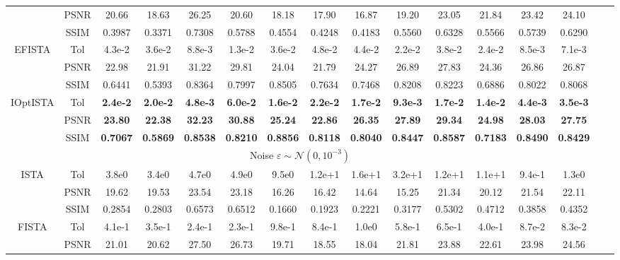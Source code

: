 \documentclass{article}
\begin{document}
\begin{table*}[thp]
\begin{center}
\begin{tabular}{c|c|c c | cc | cc| cc| cc| cc cc }
	  & PSNR & 20.66 & 18.63 & 26.25 & 20.60  & 18.18 & 17.90 & 16.87 & 19.20 & 23.05 & 21.84 & 23.42 & 24.10 \\ 
      & SSIM & 0.3987 & 0.3371 & 0.7308 & 0.5788  & 0.4554 & 0.4248 & 0.4183 & 0.5560 & 0.6328 & 0.5566 & 0.5739 & 0.6290  \\\hline
\multirow{3}{*}{EFISTA} & Tol & 4.3e-2 & 3.6e-2 & 8.8e-3 & 1.3e-2  & 3.6e-2 & 4.8e-2 & 4.4e-2 & 2.2e-2 & 3.8e-2 & 2.4e-2 & 8.5e-3 & 7.1e-3    \\
	  & PSNR & 22.98 & 21.91 & 31.22 & 29.81  & 24.04 & 21.79 & 24.27 & 26.89 & 27.83 & 24.36 & 26.86 & 26.87 \\ 
      & SSIM & 0.6441 & 0.5393 & 0.8364 & 0.7997  & 0.8505 & 0.7634 & 0.7468 & 0.8208 & 0.8223 & 0.6886 & 0.8022 & 0.8068  \\\hline
\multirow{3}{*}{IOptISTA} & Tol & \textbf{2.4e-2} & \textbf{2.0e-2} & \textbf{4.8e-3} & \textbf{6.0e-2}  & \textbf{1.6e-2} & \textbf{2.2e-2} & \textbf{1.7e-2} & \textbf{9.3e-3} & \textbf{1.7e-2} & \textbf{1.4e-2} & \textbf{4.4e-3} & \textbf{3.5e-3}  \\
	  & PSNR & \textbf{23.80} & \textbf{22.38} & \textbf{32.23} & \textbf{30.88}  & \textbf{25.24} & \textbf{22.86} & \textbf{26.35} & \textbf{27.89} & \textbf{29.34} & \textbf{24.98} & \textbf{28.03} & \textbf{27.75} \\ 
      & SSIM & \textbf{0.7067} & \textbf{0.5869} & \textbf{0.8538} & \textbf{0.8210}  & \textbf{0.8856} & \textbf{0.8118} & \textbf{0.8040} & \textbf{0.8447} & \textbf{0.8587} & \textbf{0.7183} & \textbf{0.8490} & \textbf{0.8429} \\\hline
\multicolumn{14}{c}{Noise $\varepsilon\sim \mathcal{N}(0,10^{-3})$} \\\hline
\multirow{3}{*}{ISTA} & Tol & 3.8e0 &3.4e0 & 4.7e0 & 4.9e0  & 9.5e0 & 1.2e+1 & 1.6e+1 & 3.2e+1 & 1.2e+1 & 1.1e+1 & 9.4e-1 & 1.3e0    \\
	  & PSNR & 19.62 & 19.53 & 23.54 & 23.18  & 16.26 & 16.42 & 14.64 & 15.25 & 21.34 & 20.12 & 21.54 & 22.11  \\ 
      & SSIM & 0.2854 & 0.2803 & 0.6573 & 0.6512  & 0.1660 & 0.1923 & 0.2221 & 0.3177 & 0.5302 & 0.4712 & 0.3858 & 0.4352   \\\hline
\multirow{3}{*}{FISTA} & Tol & 4.1e-1 & 3.5e-1 & 2.4e-1 & 2.3e-1  & 9.8e-1 & 8.4e-1 & 1.0e0 & 5.8e-1 & 6.5e-1 & 4.0e-1 & 8.7e-2 & 8.3e-2    \\
	  & PSNR & 21.01 & 20.62 & 27.50 & 26.73  & 19.71 & 18.55 & 18.04 & 21.81 & 23.88 & 22.61 & 23.98 & 24.56  \\ 

\end{tabular}
\end{center}
\end{table*}
\end{document}
